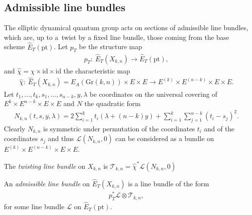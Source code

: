 \documentclass[10pt,a4paper]{amsart}
\numberwithin{equation}{section}
\begin{document}
\subsection{Admissible line bundles}
The elliptic dynamical quantum group acts on sections of admissible line bundles, which are, up to a~twist by a fixed line bundle, those coming from the base scheme $\hat E_{T}(\mathrm{pt})$. Let $p_T$ be the structure map
\begin{gather*}
 p_T\colon \ \hat E_T(X_{k,n})\to \hat E_T(\mathrm{pt}),
\end{gather*}
and $\hat\chi=\chi\times \mathrm{id}\times\mathrm{id}$ the characteristic map
\begin{gather*}
 \hat\chi \colon \ \hat E_T(X_{k,n})=E_A(\mathrm{Gr}(k,n))\times E\times E\to E^{(k)}\times E^{(n-k)}\times E\times E.
\end{gather*}
Let $t_1,\dots,t_k,s_1,\dots,s_{n-k},y,\lambda$ be coordinates on the universal covering of $E^k\times E^{n-k}\times E\times E$ and $N$ the quadratic form
\begin{gather}\label{e-Nkn}
 N_{k,n}(t,s,y,\lambda)=2\sum_{i=1}^k t_i(\lambda+(n-k)y)+\sum_{i=1}^k\sum_{j=1}^{n-k}(t_i-s_j)^2.
\end{gather}
Clearly $N_{k,n}$ is symmetric under permutation of the coordinates $t_i$ and of the coordinates $s_j$ and thus $\mathcal L(N_{k,n},0)$ can be considered as a bundle on $E^{(k)}\times E^{(n-k)}\times E\times E$.
\begin{Definition}\label{def-tlb}
 The {\em twisting line bundle} on $X_{k,n}$ is $\mathcal T_{k,n}=\hat\chi^*\mathcal L(N_{k,n},0)$
\end{Definition}
\begin{Definition} An {\em admissible line bundle} on $\hat E_T(X_{k,n})$ is a line bundle of the form
 \begin{gather*}
 p_T^*\mathcal L\otimes \mathcal T_{k,n},
 \end{gather*}
 for some line bundle $\mathcal L$ on $\hat E_T(\mathrm{pt})$.
\end{Definition}
\end{document}
